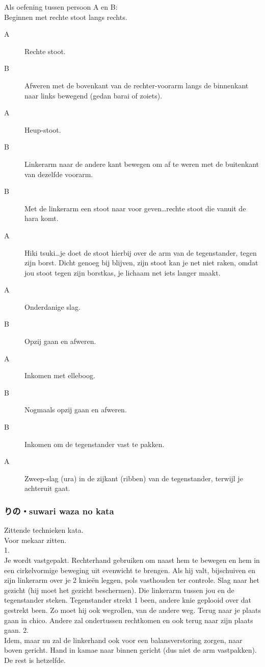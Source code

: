 Als oefening tussen persoon A en B:\\
Beginnen met rechte stoot langs rechts.\\
\begin{description}
\item [A] Rechte stoot.
\item [B] Afweren met de bovenkant van de rechter-voorarm langs de binnenkant naar links bewegend (gedan barai of zoiets).
\item [A] Heup-stoot.
\item [B] Linkerarm naar de andere kant bewegen om af te weren met de buitenkant van dezelfde voorarm.
\item [B] Met de linkerarm een stoot naar voor geven\ldots rechte stoot die vanuit de hara komt.
\item [A] Hiki tsuki\ldots je doet de stoot hierbij over de arm van de tegenstander, tegen zijn borst. Dicht genoeg bij blijven, zijn stoot kan je net niet raken, omdat jou stoot tegen zijn borstkas, je lichaam net iets langer maakt.
\item [A] Onderdanige slag.
\item [B] Opzij gaan en afweren.
\item [A] Inkomen met elleboog.
\item [B] Nogmaals opzij gaan en afweren.
\item [B] Inkomen om de tegenstander vast te pakken.
\item [A] Zweep-slag (ura) in de zijkant (ribben) van de tegenstander, terwijl je achteruit gaat.
\end{description}

\subsubsection{りの・suwari waza no kata}
Zittende technieken kata.\\
Voor mekaar zitten.\\
1.\\
Je wordt vastgepakt. Rechterhand gebruiken om naast hem te bewegen en hem in een cirkelvormige beweging uit evenwicht te brengen. Als hij valt, bijschuiven en zijn linkerarm over je 2 knie\"{e}n leggen, pols vasthouden ter controle. Slag naar het gezicht (hij moet het gezicht beschermen). Die linkerarm tussen jou en de tegenstander steken. Tegenstander strekt 1 been, andere knie geplooid over dat gestrekt been. Zo moet hij ook wegrollen, van de andere weg. Terug naar je plaats gaan in chico. Andere zal ondertussen rechtkomen en ook terug naar zijn plaats gaan.
2.\\
Idem, maar nu zal de linkerhand ook voor een balansverstoring zorgen, naar boven gericht. Hand in kamae naar binnen gericht (dus niet de arm vastpakken). De rest is hetzelfde.

